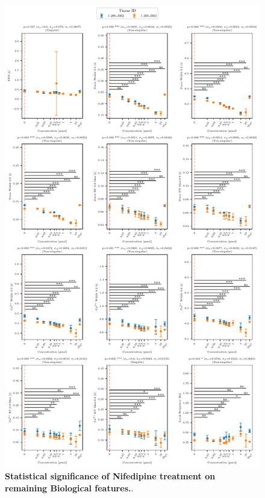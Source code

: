 \documentclass{report}
\begin{document}
    \begin{figure}
        \centering
        \includegraphics[width=1\textwidth, height=0.99\textheight, keepaspectratio]{plots/chapter_5/nifedipine/significance_features_lmer_subset_12.pdf}
        \caption[Statistical significance of Nifedipine treatment on remaining Biological features.]{\textbf{Statistical significance of Nifedipine treatment on remaining Biological features.}.}
        \label{fig:nifedipine-remaining-significance}
    \end{figure}
\end{document}
